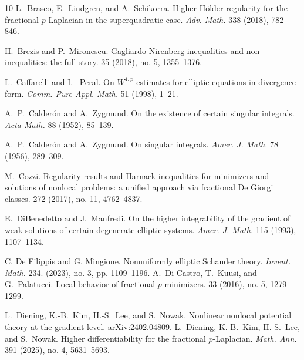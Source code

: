 \documentclass[10pt,letterpaper]{amsart}
\theoremstyle{definition}
\numberwithin{theorem}{section}
\numberwithin{equation}{section}
\newcommand{\1}{\ensuremath{\mathds{1}}}
\numberwithin{equation}{section}
\begin{document}
\begin{thebibliography}{10}
\newblock L.~Brasco, E.~Lindgren, and A.~Schikorra. 
\newblock Higher H\"older regularity for the fractional $p$-Laplacian in the superquadratic case.
\newblock \emph{Adv. Math.} 338 (2018), 782--846.

\newblock H.~Brezis and P.~Mironescu.
\newblock Gagliardo-Nirenberg inequalities and non-inequalities: the full story.
 35 (2018), no. 5, 1355--1376.
%

\newblock L.~Caffarelli and I.~ Peral.
\newblock On $W^{1,p}$ estimates for elliptic equations in divergence form.
\newblock \emph{Comm. Pure Appl. Math.} 51 (1998), 1--21.

\newblock A.~P.~Calder\'on and A.~Zygmund. 
\newblock On the existence of certain singular integrals. 
\newblock \emph{Acta Math.} 88 (1952), 85--139.

\newblock A.~P.~Calder\'on and A.~Zygmund. 
\newblock On singular integrals. 
\newblock \emph{Amer. J. Math.} 78 (1956),
289--309.

\newblock M.~Cozzi.
\newblock Regularity results and Harnack inequalities for minimizers and solutions of nonlocal problems: a unified approach via fractional De Giorgi classes.
 272 (2017), no. 11, 4762--4837.

\newblock E.~DiBenedetto and J.~Manfredi.
\newblock On the higher integrability of the gradient of weak solutions of certain degenerate elliptic systems. 
\newblock \emph{Amer. J. Math.} 115 (1993), 1107--1134.


\newblock C. De Filippis and G. Mingione. 
\newblock Nonuniformly elliptic Schauder theory.
\newblock \emph{Invent. Math.} 234. (2023), no. 3, pp. 1109--1196. 
\newblock A.~Di Castro, T.~Kuusi, and G.~Palatucci.
\newblock Local behavior of fractional $p$-minimizers. 
 33 (2016), no. 5, 1279--1299.


\newblock L.~Diening, K.-B.~Kim, H.-S.~Lee, and S.~Nowak.
\newblock Nonlinear nonlocal potential theory at the gradient level.
\newblock arXiv:2402.04809.
%
\newblock L.~Diening, K.-B.~Kim, H.-S.~Lee, and S.~Nowak.
\newblock Higher differentiability for the fractional $p$-Laplacian. 
\newblock \emph{Math. Ann.} 391 (2025), no. 4, 5631--5693.
%


\end{thebibliography}
\end{document}
